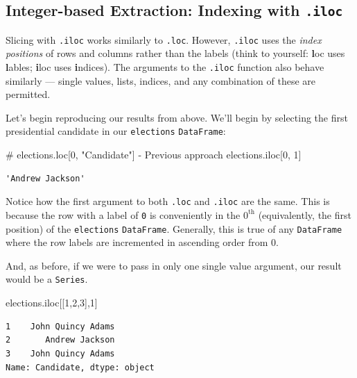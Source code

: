 \documentclass[
  letterpaper,
  DIV=11,
  numbers=noendperiod]{scrreprt}
\newenvironment{Shaded}{\begin{snugshade}}{\end{snugshade}}
\newcommand{\CommentTok}[1]{\textcolor[rgb]{0.37,0.37,0.37}{#1}}
\newcommand{\DecValTok}[1]{\textcolor[rgb]{0.68,0.00,0.00}{#1}}
\newcommand{\NormalTok}[1]{\textcolor[rgb]{0.00,0.23,0.31}{#1}}
\begin{document}
\subsection{\texorpdfstring{Integer-based Extraction: Indexing with
\texttt{.iloc}}{Integer-based Extraction: Indexing with .iloc}}\label{integer-based-extraction-indexing-with-.iloc}

Slicing with \texttt{.iloc} works similarly to \texttt{.loc}. However,
\texttt{.iloc} uses the \emph{index positions} of rows and columns
rather than the labels (think to yourself: \textbf{l}oc uses
\textbf{l}ables; \textbf{i}loc uses \textbf{i}ndices). The arguments to
the \texttt{.iloc} function also behave similarly --- single values,
lists, indices, and any combination of these are permitted.

Let's begin reproducing our results from above. We'll begin by selecting
the first presidential candidate in our \texttt{elections}
\texttt{DataFrame}:

\begin{Shaded}
\begin{Highlighting}[]
\CommentTok{\# elections.loc[0, "Candidate"] {-} Previous approach}
\NormalTok{elections.iloc[}\DecValTok{0}\NormalTok{, }\DecValTok{1}\NormalTok{]}
\end{Highlighting}
\end{Shaded}

\begin{verbatim}
'Andrew Jackson'
\end{verbatim}

Notice how the first argument to both \texttt{.loc} and \texttt{.iloc}
are the same. This is because the row with a label of \texttt{0} is
conveniently in the \(0^{\text{th}}\) (equivalently, the first position)
of the \texttt{elections} \texttt{DataFrame}. Generally, this is true of
any \texttt{DataFrame} where the row labels are incremented in ascending
order from 0.

And, as before, if we were to pass in only one single value argument,
our result would be a \texttt{Series}.

\begin{Shaded}
\begin{Highlighting}[]
\NormalTok{elections.iloc[[}\DecValTok{1}\NormalTok{,}\DecValTok{2}\NormalTok{,}\DecValTok{3}\NormalTok{],}\DecValTok{1}\NormalTok{]}
\end{Highlighting}
\end{Shaded}

\begin{verbatim}
1    John Quincy Adams
2       Andrew Jackson
3    John Quincy Adams
Name: Candidate, dtype: object
\end{verbatim}
\end{document}
